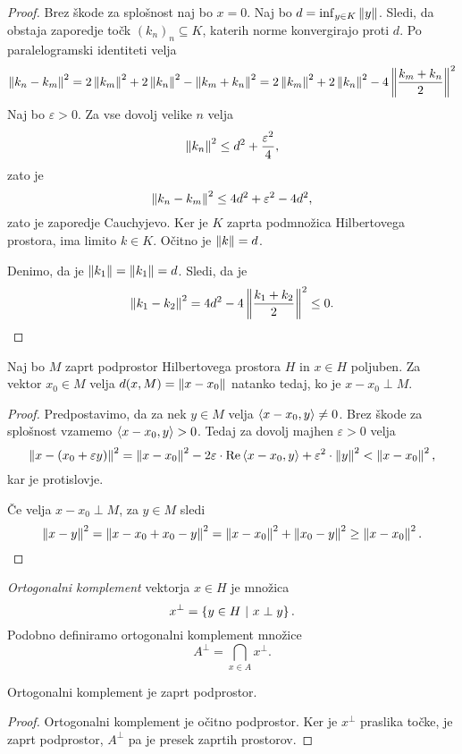 \begin{proof}
Brez škode za splošnost naj bo $x=0$. Naj bo
$d = \inf_{y \in K} \left\lVert y\right\rVert$. Sledi, da obstaja zaporedje točk
$(k_n)_n \subseteq K$, katerih norme konvergirajo proti $d$. Po
paralelogramski identiteti velja
\[
\left\lVert k_n - k_m\right\rVert^2 =
2 \left\lVert k_m\right\rVert^2 + 2 \left\lVert k_n\right\rVert^2 - \left\lVert k_m+k_n\right\rVert^2 =
2 \left\lVert k_m\right\rVert^2 + 2 \left\lVert k_n\right\rVert^2 - 4 \left\lVert \frac{k_m+k_n}{2}\right\rVert^2
\]
Naj bo $\varepsilon > 0$. Za vse dovolj velike $n$ velja
\[
\left\lVert k_n\right\rVert^2 \leq d^2 + \frac{\varepsilon^2}{4},
\]
zato je
\[
\left\lVert k_n - k_m\right\rVert^2 \leq 4d^2 + \varepsilon^2 - 4d^2,
\]
zato je zaporedje Cauchyjevo. Ker je $K$ zaprta podmnožica
Hilbertovega prostora, ima limito $k \in K$. Očitno je
$\left\lVert k\right\rVert = d$.

Denimo, da je $\left\lVert k_1\right\rVert = \left\lVert k_1\right\rVert = d$. Sledi, da je
\[
\left\lVert k_1 - k_2\right\rVert^2 = 4d^2 - 4 \left\lVert \frac{k_1+k_2}{2}\right\rVert^2 \leq 0.
\qedhere
\]
\end{proof}

\begin{izrek}
Naj bo $M$ zaprt podprostor Hilbertovega prostora $H$ in $x \in H$
poljuben. Za vektor $x_0 \in M$ velja $d(x,M) = \left\lVert x-x_0\right\rVert$
natanko tedaj, ko je $x-x_0 \perp M$.
\end{izrek}

\begin{proof}
Predpostavimo, da za nek $y \in M$ velja $\left\langle x-x_0,y\right\rangle \ne 0$.
Brez škode za splošnost vzamemo $\left\langle x-x_0,y\right\rangle > 0$. Tedaj za
dovolj majhen $\varepsilon > 0$ velja
\[
\left\lVert x-(x_0 + \varepsilon y)\right\rVert^2 =
\left\lVert x-x_0\right\rVert^2 - 2 \varepsilon \cdot \operatorname{Re} \left\langle x-x_0,y\right\rangle +
\varepsilon^2 \cdot \left\lVert y\right\rVert^2 <
\left\lVert x-x_0\right\rVert^2,
\]
kar je protislovje.

Če velja $x-x_0 \perp M$, za $y \in M$ sledi
\[
\left\lVert x-y\right\rVert^2 = \left\lVert x-x_0+x_0-y\right\rVert^2 =
\left\lVert x-x_0\right\rVert^2 + \left\lVert x_0-y\right\rVert^2 \geq \left\lVert x-x_0\right\rVert^2. \qedhere
\]
\end{proof}

\begin{definicija}
\emph{Ortogonalni komplement}
vektorja $x \in H$ je množica
\[
x^\bot = \left\{y \in H~\middle\vert~x \perp y\right\}.
\]
Podobno definiramo ortogonalni komplement množice
\[
A^\bot = \bigcap_{x \in A} x^\bot.
\]
\end{definicija}

\begin{trditev}
Ortogonalni komplement je zaprt podprostor.
\end{trditev}

\begin{proof}
Ortogonalni komplement je očitno podprostor. Ker je $x^\bot$
praslika točke, je zaprt podprostor, $A^\bot$ pa je presek zaprtih
prostorov.
\end{proof}

